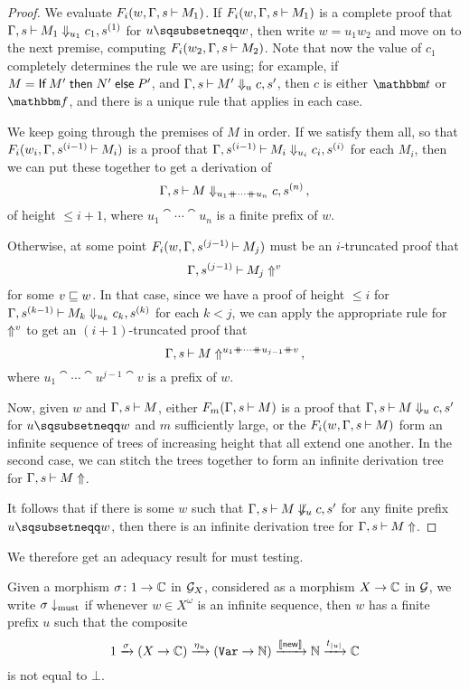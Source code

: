 \documentclass[11pt]{report}
\begin{document}
\begin{proof}
  We evaluate $F_i(w,\Gamma,s\mathbin{\vdash} M_1)$.  
  If $F_i(w,\Gamma,s\mathbin{\vdash} M_1)$ is a complete proof that $\Gamma,s\mathbin{\vdash} M_1 \Downarrow_{u_1} c_1,s^{(1)}$ for $u\pprefix w$, then write $w=u_1w_2$ and move on to the next premise, computing $F_i(w_2,\Gamma,s\mathbin{\vdash} M_2)$.  
  Note that now the value of $c_1$ completely determines the \IAX rule we are using; for example, if $M=\operatorname{\mathsf{If}} M' \mathrel{\mathsf{then}} N' \mathrel{\mathsf{else}} P'$, and $\Gamma,s\mathbin{\vdash} M' \Downarrow_{u} c,s'$, then $c$ is either $\true$ or $\false$, and there is a unique \IAX rule that applies in each case.

  We keep going through the premises of $M$ in order.  
  If we satisfy them all, so that $F_i(w_i,\Gamma,s^{(i-1)} \mathbin{\vdash} M_i)$ is a proof that $\Gamma,s^{(i-1)} \mathbin{\vdash} M_i \Downarrow_{u_i} c_i,s^{(i)}$ for each $M_i$, then we can put these together to get a derivation of
  \[
    \Gamma,s \mathbin{\vdash} M\Downarrow_{u_1\mathbin{+\mkern-10mu+} \cdots \mathbin{+\mkern-10mu+} u_n} c,s^{(n)}\,,
    \]
  of height $\le i+1$, where $u_1\cat \cdots \cat u_n$ is a finite prefix of $w$.
  
  Otherwise, at some point $F_i(w,\Gamma,s^{(j-1)}\mathbin{\vdash} M_j)$ must be an $i$-truncated proof that
  \[
    \Gamma,s^{(j-1)}\mathbin{\vdash} M_j\Uparrow^v
    \]
  for some $v\sqsubseteq w$.
  In that case, since we have a proof of height $\le i$ for $\Gamma,s^{(k-1)}\mathbin{\vdash} M_k \Downarrow_{u_k} c_k,s^{(k)}$ for each $k<j$, we can apply the appropriate rule for $\Uparrow^v$ to get an $(i+1)$-truncated proof that
  \[
    \Gamma,s\mathbin{\vdash} M\Uparrow^{u_1\mathbin{+\mkern-10mu+} \cdots \mathbin{+\mkern-10mu+} u_{j-1} \mathbin{+\mkern-10mu+} v}\,,
    \]
  where $u_1\cat \cdots \cat u^{j-1} \cat v$ is a prefix of $w$.

  Now, given $w$ and $\Gamma,s\mathbin{\vdash} M$, either $F_m(\Gamma,s\mathbin{\vdash} M)$ is a proof that $\Gamma,s\mathbin{\vdash} M\Downarrow_u c,s'$ for $u\pprefix w$ and $m$ sufficiently large, or the $F_i(w,\Gamma,s\mathbin{\vdash} M)$ form an infinite sequence of trees of increasing height that all extend one another.  
  In the second case, we can stitch the trees together to form an infinite derivation tree for $\Gamma,s\mathbin{\vdash} M\Uparrow$.

  It follows that if there is some $w$ such that $\Gamma,s\mathbin{\vdash} M\not\Downarrow_u c,s'$ for any finite prefix $u\pprefix w$, then there is an infinite derivation tree for $\Gamma,s\mathbin{\vdash} M\Uparrow$.
\end{proof}

We therefore get an adequacy result for must testing.

\begin{definition}
  Given a morphism $\sigma\colon 1\to\mathbb{C}$ in $\mathcal G_X$, considered as a morphism $X \to \mathbb{C}$ in $\mathcal G$, we write $\sigma\downarrow_{\operatorname{must}}$ if whenever $w\in X^\omega$ is an infinite sequence, then $w$ has a finite prefix $u$ such that the composite
  \[
    1 \xrightarrow{\sigma}
    (X \to \mathbb{C}) \xrightarrow{\eta_u}
    ({\mathtt{Var}} \to \mathbb{N}) \xrightarrow{\left\llbracket\operatorname{{\mathsf{new}}}\right\rrbracket}
    \mathbb{N} \xrightarrow{t_{|u|}}
    \mathbb{C}
    \]
  is not equal to $\bot$.
\end{definition}
\end{document}
